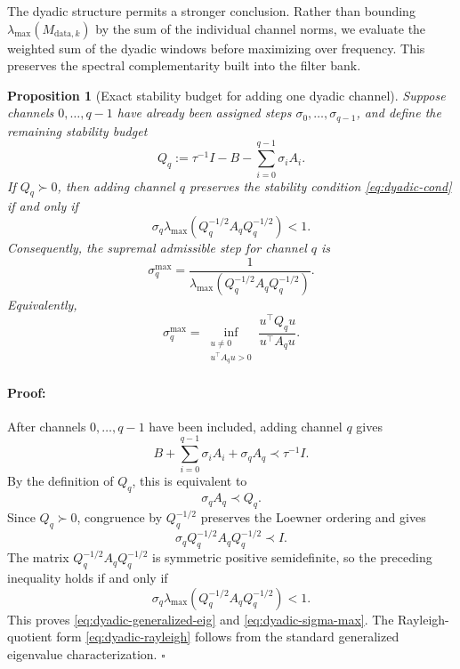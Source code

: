\documentclass{article}
\newenvironment{proof}{\paragraph{Proof:}}{\hfill$\square$}
\newtheorem{proposition}[theorem]{Proposition}
\begin{document}
The dyadic structure permits a stronger conclusion.  Rather than
bounding $\lambda_{\max}(M_{\mathrm{data},k})$ by the sum of the
individual channel norms, we evaluate the weighted sum of the
dyadic windows before maximizing over frequency.  This preserves
the spectral complementarity built into the filter bank.

\begin{proposition}[Exact stability budget for adding one dyadic channel]
\label{prop:dyadic-budget}
Suppose channels $0,\ldots,q-1$ have already been assigned steps
$\sigma_0,\ldots,\sigma_{q-1}$, and define the remaining stability
budget
\begin{equation}
\label{eq:Qq}
Q_q
:=
\tau^{-1}I
-
B
-
\sum_{i=0}^{q-1}\sigma_iA_i.
\end{equation}
If $Q_q\succ0$, then adding channel $q$ preserves the stability
condition \eqref{eq:dyadic-cond} if and only if
\begin{equation}
\label{eq:dyadic-generalized-eig}
\sigma_q
\lambda_{\max}
\left(
Q_q^{-1/2}A_qQ_q^{-1/2}
\right)
<1.
\end{equation}
Consequently, the supremal admissible step for channel $q$ is
\begin{equation}
\label{eq:dyadic-sigma-max}
\sigma_q^{\max}
=
\frac{1}{
\lambda_{\max}
\left(
Q_q^{-1/2}A_qQ_q^{-1/2}
\right)
}.
\end{equation}
Equivalently,
\begin{equation}
\label{eq:dyadic-rayleigh}
\sigma_q^{\max}
=
\inf_{\substack{u\neq0\\u^\top A_qu>0}}
\frac{u^\top Q_qu}{u^\top A_qu}.
\end{equation}
\end{proposition}

\begin{proof}
After channels $0,\ldots,q-1$ have been included, adding channel
$q$ gives
\[
B+\sum_{i=0}^{q-1}\sigma_iA_i+\sigma_qA_q
\prec
\tau^{-1}I.
\]
By the definition of $Q_q$, this is equivalent to
\[
\sigma_qA_q\prec Q_q.
\]
Since $Q_q\succ0$, congruence by $Q_q^{-1/2}$ preserves the
Loewner ordering and gives
\[
\sigma_q
Q_q^{-1/2}A_qQ_q^{-1/2}
\prec I.
\]
The matrix $Q_q^{-1/2}A_qQ_q^{-1/2}$ is symmetric positive
semidefinite, so the preceding inequality holds if and only if
\[
\sigma_q
\lambda_{\max}
\left(
Q_q^{-1/2}A_qQ_q^{-1/2}
\right)<1.
\]
This proves \eqref{eq:dyadic-generalized-eig} and
\eqref{eq:dyadic-sigma-max}.  The Rayleigh-quotient form
\eqref{eq:dyadic-rayleigh} follows from the standard generalized
eigenvalue characterization.
\end{proof}
\end{document}

